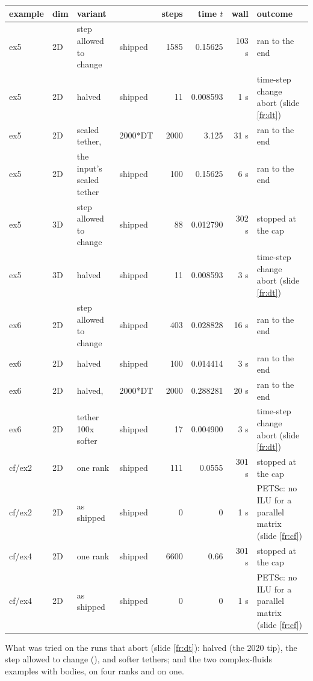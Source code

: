 \setlength{\tabcolsep}{3pt}
\begin{tabular}{@{}l l l l r r r L{0.27\textwidth}@{}}
\toprule
example & dim & variant &  & steps & time $t$ & wall & outcome \\
\midrule
ex5 & 2D & step allowed to change & shipped & 1585 & 0.15625 & 103 s & ran to the end \\
ex5 & 2D &  halved & shipped & 11 & 0.008593 & 1 s & time-step change abort (slide \ref{fr:dt}) \\
ex5 & 2D & scaled tether,  & 2000*DT & 2000 & 3.125 & 31 s & ran to the end \\
ex5 & 2D & the input's scaled tether & shipped & 100 & 0.15625 & 6 s & ran to the end \\
ex5 & 3D & step allowed to change & shipped & 88 & 0.012790 & 302 s & stopped at the cap \\
ex5 & 3D &  halved & shipped & 11 & 0.008593 & 3 s & time-step change abort (slide \ref{fr:dt}) \\
ex6 & 2D & step allowed to change & shipped & 403 & 0.028828 & 16 s & ran to the end \\
ex6 & 2D &  halved & shipped & 100 & 0.014414 & 3 s & ran to the end \\
ex6 & 2D &  halved,  & 2000*DT & 2000 & 0.288281 & 20 s & ran to the end \\
ex6 & 2D & tether 100x softer & shipped & 17 & 0.004900 & 3 s & time-step change abort (slide \ref{fr:dt}) \\
cf/ex2 & 2D & one rank & shipped & 111 & 0.0555 & 301 s & stopped at the cap \\
cf/ex2 & 2D & as shipped & shipped & 0 & 0 & 1 s & PETSc: no ILU for a parallel matrix (slide \ref{fr:cf}) \\
cf/ex4 & 2D & one rank & shipped & 6600 & 0.66 & 301 s & stopped at the cap \\
cf/ex4 & 2D & as shipped & shipped & 0 & 0 & 1 s & PETSc: no ILU for a parallel matrix (slide \ref{fr:cf}) \\
\bottomrule
\end{tabular}

\medskip
\scriptsize What was tried on the runs that abort (slide \ref{fr:dt}):  halved (the 2020 tip), the step allowed to change (), and softer tethers; and the two complex-fluids examples with bodies, on four ranks and on one.
